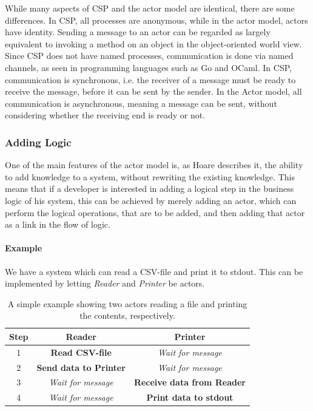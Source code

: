 While many aspects of CSP and the actor model are identical, there are some differences. In CSP, all processes are anonymous, while in the actor model, actors have identity. Sending a message to an actor can be regarded as largely equivalent to invoking a method on an object in the object-oriented world view. Since CSP does not have named processes, communication is done via named channels, as seen in programming languages such as Go and OCaml. 
In CSP, communication is synchronous, i.e. the receiver of a message must be ready to receive the message, before it can be sent by the sender. In the Actor model, all communication is asynchronous, meaning a message can be sent, without considering whether the receiving end is ready or not.

\subsubsection{Adding Logic}
One of the main features of the actor model is, as Hoare describes it, the ability to add knowledge to a system, without rewriting the existing knowledge. This means that if a developer is interested in adding a logical step in the business logic of his system, this can be achieved by merely adding an actor, which can perform the logical operations, that are to be added, and then adding that actor as a link in the flow of logic.

\paragraph{Example}
We have a system which can read a CSV-file and print it to stdout. This can be implemented by letting \emph{Reader} and \emph{Printer} be actors.

\begin{table}
\begin{tabular}{ | c | c | c | }
\hline
Step & Reader & Printer \\\hline
1 & \textbf{Read CSV-file} & \textit{Wait for message} \\\hline
2 & \textbf{Send data to Printer} & \textit{Wait for message}\\\hline
3 & \textit{Wait for message} & \textbf{Receive data from Reader}\\\hline
4 & \textit{Wait for message} & \textbf{Print data to stdout}\\\hline
\end{tabular}
\label{ReadPrintExample}
\caption{A simple example showing two actors reading a file and printing the contents, respectively.}
\end{table}

